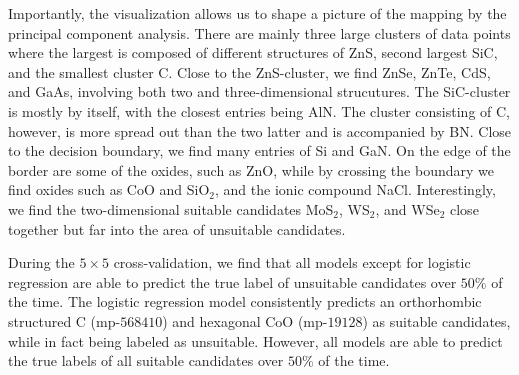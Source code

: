 Importantly, the visualization allows us to shape a picture of the mapping by the principal component analysis. There are mainly three large clusters of data points where the largest is composed of different structures of ZnS, second largest SiC, and the smallest cluster C. %
Close to the ZnS-cluster, we find ZnSe, ZnTe, CdS, and GaAs, involving both two and three-dimensional strucutures.
The SiC-cluster is mostly by itself, with the closest entries being AlN. The cluster consisting of C, however, is more spread out than the two latter and is accompanied by BN. Close to the decision boundary, we find many entries of Si and GaN. On the edge of the border are some of the oxides, such as ZnO, while by crossing the boundary we find oxides such as CoO and SiO$_2$, and the ionic compound NaCl. Interestingly, we find the two-dimensional suitable candidates MoS$_2$, WS$_2$, and WSe$_2$ close together but far into the area of unsuitable candidates.

During the $5\times 5$ cross-validation, we find that all models except for logistic regression are able to predict the true label of unsuitable candidates over $50 \%$ of the time.
The logistic regression model consistently predicts an orthorhombic structured C (mp-$568410$) and hexagonal CoO (mp-$19128$) as suitable candidates, while in fact being labeled as unsuitable. However, all models are able to predict the true labels of all suitable candidates over $50\%$ of the time.


